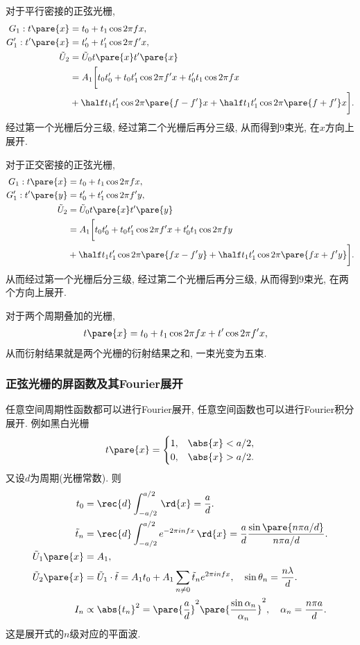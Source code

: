 \documentclass{ctexart}
\begin{document}
对于平行密接的正弦光栅,
\begin{align*}
    G_1: t\pare{x} &= t_0 + t_1 \cos 2\pi fx, \\
    G'_1: t'\pare{x} &= t'_0 + t'_1 \cos 2\pi f' x, \\
    \tilde{U}_2 &= \tilde{U}_0 t\pare{x} t'\pare{x} \\
    &= A_1 \bigg[ t_0t_0' + t_0t_1'\cos 2\pi f'x + t_0' t_1 \cos 2\pi fx \\ & + \half t_1t_1'\cos 2\pi \pare{f-f'}x + \half t_1 t_1' \cos 2\pi \pare{f+f'}x \bigg].
\end{align*}
经过第一个光栅后分三级, 经过第二个光栅后再分三级, 从而得到$9$束光, 在$x$方向上展开.
\par
对于正交密接的正弦光栅,
\begin{align*}
    G_1: t\pare{x} &= t_0 + t_1 \cos 2\pi fx, \\
    G'_1: t'\pare{y} &= t'_0 + t'_1 \cos 2\pi f' y, \\
    \tilde{U}_2 &= \tilde{U}_0 t\pare{x} t'\pare{y} \\
    &= A_1 \bigg[ t_0t_0' + t_0t_1'\cos 2\pi f'x + t_0' t_1 \cos 2\pi fy \\ & + \half t_1t_1'\cos 2\pi \pare{fx-f'y} + \half t_1 t_1' \cos 2\pi \pare{fx+f'y} \bigg].
\end{align*}
从而经过第一个光栅后分三级, 经过第二个光栅后再分三级, 从而得到$9$束光, 在两个方向上展开.
\par
对于两个周期叠加的光栅,
\begin{align*}
    t\pare{x} &= t_0 + t_1 \cos 2\pi fx + t'\cos 2\pi f'x,
\end{align*}
从而衍射结果就是两个光栅的衍射结果之和, 一束光变为五束.


\subsubsection{正弦光栅的屏函数及其Fourier展开} %
\label{ssub:正弦光栅的屏函数及其fourier展开}

任意空间周期性函数都可以进行Fourier展开, 任意空间函数也可以进行Fourier积分展开. 例如黑白光栅
\[ t\pare{x} = \begin{cases}
    1, & \abs{x} < a/2, \\
    0, & \abs{x} > a/2.
\end{cases} \]
又设$d$为周期(光栅常数). 则
\begin{align*}
    t_0 &= \rec{d} \int_{-a/2}^{a/2}\,\rd{x} = \frac{a}{d}. \\
    \tilde{t}_n &= \rec{d} \int_{-a/2}^{a/2} e^{-2\pi i nfx}\,\rd{x} = \frac{a}{d}\frac{\sin\pare{n\pi a/d}}{n\pi a/d}. \\
    \tilde{U}_1\pare{x} &= A_1,\\
    \tilde{U}_2\pare{x} &= \tilde{U}_1\cdot\tilde{t} = A_1 t_0 + A_1 \sum_{n\neq 0} \tilde{t}_n e^{2\pi infx},\quad \sin\theta_n = \frac{n\lambda}{d}. \\
    I_n &\propto \abs{t_n}^2 = \pare{\frac{a}{d}}^2\pare{\frac{\sin\alpha_n}{\alpha_n}}^2,\quad \alpha_n = \frac{n\pi a}{d}.
\end{align*}
这是展开式的$n$级对应的平面波.
\end{document}
